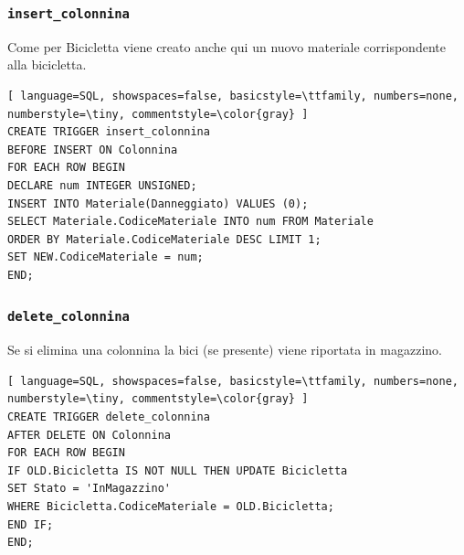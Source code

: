 \documentclass[a4paper,twoside]{article}
\begin{document}
\subsubsection{\texttt{insert\_colonnina}}
Come per Bicicletta viene creato anche qui un nuovo materiale corrispondente alla bicicletta.
\begin{lstlisting}[ language=SQL, showspaces=false, basicstyle=\ttfamily, numbers=none, numberstyle=\tiny, commentstyle=\color{gray} ]
CREATE TRIGGER insert_colonnina
BEFORE INSERT ON Colonnina
FOR EACH ROW BEGIN
DECLARE num INTEGER UNSIGNED;
INSERT INTO Materiale(Danneggiato) VALUES (0);
SELECT Materiale.CodiceMateriale INTO num FROM Materiale
ORDER BY Materiale.CodiceMateriale DESC LIMIT 1;
SET NEW.CodiceMateriale = num;
END;
\end{lstlisting}
\subsubsection{\texttt{delete\_colonnina}}
Se si elimina una colonnina la bici (se presente) viene riportata in magazzino.
\begin{lstlisting}[ language=SQL, showspaces=false, basicstyle=\ttfamily, numbers=none, numberstyle=\tiny, commentstyle=\color{gray} ]
CREATE TRIGGER delete_colonnina
AFTER DELETE ON Colonnina
FOR EACH ROW BEGIN
IF OLD.Bicicletta IS NOT NULL THEN UPDATE Bicicletta
SET Stato = 'InMagazzino'
WHERE Bicicletta.CodiceMateriale = OLD.Bicicletta;
END IF;
END;
\end{lstlisting}
\end{document}
